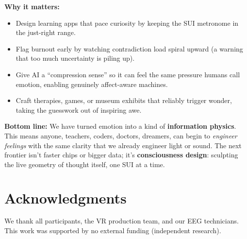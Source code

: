 \documentclass[12pt,a4paper]{article}
\begin{document}
\medskip
\noindent\textbf{Why it matters:}
\begin{itemize}[leftmargin=*]
  \item Design learning apps that pace curiosity by keeping the SUI metronome in the just-right range.
  \item Flag burnout early by watching contradiction load spiral upward (a warning that too much uncertainty is piling up).
  \item Give AI a “compression sense” so it can feel the same pressure humans call emotion, enabling genuinely affect-aware machines.
  \item Craft therapies, games, or museum exhibits that reliably trigger wonder, taking the guesswork out of inspiring awe.
\end{itemize}

\medskip
\noindent\textbf{Bottom line:} We have turned emotion into a kind of \textbf{information physics}. This means anyone, teachers, coders, doctors, dreamers, can begin to \emph{engineer feelings} with the same clarity that we already engineer light or sound. The next frontier isn’t faster chips or bigger data; it’s \textbf{consciousness design}: sculpting the live geometry of thought itself, one SUI at a time.

\section*{Acknowledgments}
We thank all participants, the VR production team, and our EEG technicians. This work was supported by no external funding (independent research).
\end{document}
